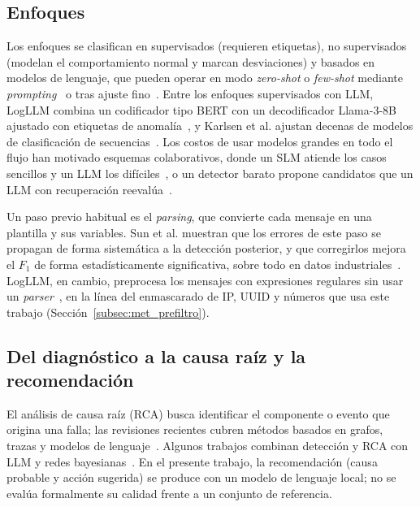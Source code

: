 \subsection{Enfoques}

Los enfoques se clasifican en supervisados (requieren etiquetas), no supervisados (modelan el comportamiento normal y marcan desviaciones) y basados en modelos de lenguaje, que pueden operar en modo \textit{zero-shot} o \textit{few-shot} mediante \textit{prompting}~\cite{liu2024_logprompt, karlsen2024_benchmark} o tras ajuste fino~\cite{lim2025_logadreft, liu2025_lineadapter}. Entre los enfoques supervisados con LLM, LogLLM combina un codificador tipo BERT con un decodificador Llama-3-8B ajustado con etiquetas de anomalía~\cite{guan2024_logllm}, y Karlsen et al. ajustan decenas de modelos de clasificación de secuencias~\cite{karlsen2024_benchmark}. Los costos de usar modelos grandes en todo el flujo han motivado esquemas colaborativos, donde un SLM atiende los casos sencillos y un LLM los difíciles~\cite{ma2026_adaptivelog}, o un detector barato propone candidatos que un LLM con recuperación reevalúa~\cite{zhang2024_lograg}.

Un paso previo habitual es el \textit{parsing}, que convierte cada mensaje en una plantilla y sus variables. Sun et al. muestran que los errores de este paso se propagan de forma sistemática a la detección posterior, y que corregirlos mejora el $F_1$ de forma estadísticamente significativa, sobre todo en datos industriales~\cite{sun2026_parsing}. LogLLM, en cambio, preprocesa los mensajes con expresiones regulares sin usar un \textit{parser}~\cite{guan2024_logllm}, en la línea del enmascarado de IP, UUID y números que usa este trabajo (Sección~\ref{subsec:met_prefiltro}).

\subsection{Del diagnóstico a la causa raíz y la recomendación}

El análisis de causa raíz (RCA) busca identificar el componente o evento que origina una falla; las revisiones recientes cubren métodos basados en grafos, trazas y modelos de lenguaje~\cite{wang2024_rca}. Algunos trabajos combinan detección y RCA con LLM y redes bayesianas~\cite{pedroso2025_maia}. En el presente trabajo, la recomendación (causa probable y acción sugerida) se produce con un modelo de lenguaje local; no se evalúa formalmente su calidad frente a un conjunto de referencia.

